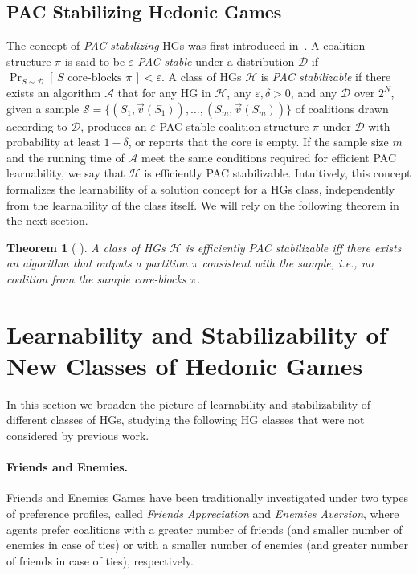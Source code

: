 \documentclass[letterpaper]{article} %
\newtheorem{theorem}{Theorem}[section]
\let\eps\varepsilon
\newcommand{\distribution}{\mathcal{D}}
\newcommand{\Prob}[2]{\Pr_{#2}\left[\,#1\,\right]}
\newcommand{\hclass}{\ensuremath{\mathcal{H}}}
\newcommand{\sample}{\ensuremath{\mathcal{S}}}
\begin{document}
\subsection{PAC Stabilizing Hedonic Games}
The concept of \emph{PAC stabilizing} HGs was first introduced in~\cite{SliwinskiZ17}. A coalition structure $\pi$ is said to be \emph{$\eps$-PAC stable} under a distribution $\distribution$ if
$\Prob{S \text{ core-blocks } \pi}{S\sim \distribution} < \eps$.
A class of HGs $\hclass$ is \emph{PAC stabilizable} if there exists an algorithm $\mathcal{A}$ that for any HG in $\hclass$, any $\eps, \delta>0$, and any $\distribution$ over $2^N$, given a sample $\sample =\{( S_1, \vec{v}(S_1)), \ldots, ( S_m, \vec{v}(S_m))\}$ of coalitions drawn according to $\distribution$, produces an $\eps$-PAC stable coalition structure $\pi$ under $\distribution$ with probability at least $1-\delta$, or reports that the core is empty. If the sample size $m$ and the running time of $\mathcal{A}$ meet the same conditions required for efficient PAC learnability, we say that $\hclass$ is efficiently PAC stabilizable.
Intuitively, this concept formalizes the learnability of a solution concept for a HGs class, independently from the learnability of the class itself.
We will rely on the following theorem in the next section.
\begin{theorem}[\citeauthor{JhaZick20} \citeyear{JhaZick20}]\label{thm:PAC_stabilizability}
A class of HGs $\mathcal{H}$ is efficiently PAC stabilizable iff there exists an algorithm that outputs a partition $\pi$ consistent with the sample, i.e., no coalition from the sample core-blocks $\pi$.
\end{theorem}

\section{Learnability and Stabilizability of New Classes of Hedonic Games}\label{sec:new_classes}
In this section we broaden the picture of learnability and stabilizability of different classes of HGs, studying the following HG classes that were not considered by previous work.

\paragraph{Friends and Enemies.}
Friends and Enemies Games have been traditionally investigated under two types of preference profiles, called \emph{Friends Appreciation} and \emph{Enemies Aversion}, where agents prefer  coalitions with a greater number of friends (and smaller number of enemies in case of ties) or with a smaller number of enemies (and greater number of friends in case of ties), respectively.
\end{document}
